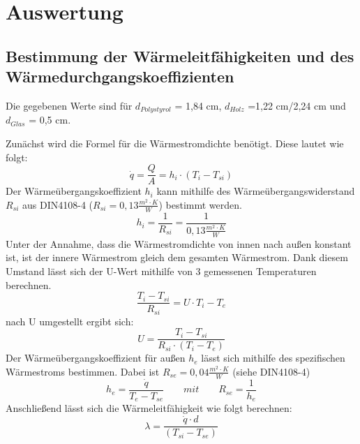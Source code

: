 \section{Auswertung}
\subsection{Bestimmung der Wärmeleitfähigkeiten und des Wärmedurchgangskoeffizienten}
Die gegebenen Werte sind für $d_{Polystyrol}$ = 1,84 cm, $d_{Holz}$ =1,22 cm/2,24 cm und $d_{Glas}$ = 0,5 cm.

Zunächst wird die Formel für die Wärmestromdichte benötigt. Diese lautet wie folgt:
\begin{equation}
\dot q=\frac{ Q }{ A }=h_{ i }\cdot(T_{ i }-T_{si})
  \label{eq:230514_Wärmestromdichte}
\end{equation}
Der Wärmeübergangskoeffizient $h_{i}$ kann mithilfe des Wärmeübergangswiderstand $R_{si}$ aus DIN4108-4 ($R_{si}=0,13 \frac{m^2 \cdot K}{W} $) bestimmt werden.
\begin{equation}
h_{i}=\frac{ 1 }{ R_{ si } }=\frac{ 1 }{ 0,13 \frac{m^2\cdot K}{ W }}
  \label{eq:230514_Wärmeübergangskoeffizient}
\end{equation}
Unter der Annahme, dass die Wärmestromdichte von innen nach außen konstant ist, ist der innere Wärmestrom gleich dem gesamten Wärmestrom. Dank diesem Umstand lässt sich der U-Wert mithilfe von 3 gemessenen Temperaturen berechnen.
\begin{equation}
\frac{ T_{i} - T_{si}}{ R_{ si } }=U \cdot T_{i} - T_{e}
  \label{eq:230514_u1}
\end{equation}
nach U umgestellt ergibt sich: 
\begin{equation}
U = \frac{ T_{i} - T_{si}}{ R_{ si } \cdot  (T_{i} - T_{e})}
  \label{eq:230514_u2}
\end{equation}
Der Wärmeübergangskoeffizient für außen $h_{e}$ lässt sich mithilfe des spezifischen Wärmestroms bestimmen. Dabei ist $R_{se}=0,04 \frac{ m^2 \cdot K }{W}$ (siehe DIN4108-4)
\begin{equation}
h_{e}=\frac{ \dot q }{ T_{e} - T_{se} }   \qquad  mit     \qquad       R_{se}=\frac{ 1 }{ h_{e} }
  \label{eq:230514_h_e}
\end{equation}
Anschließend lässt sich die Wärmeleitfähigkeit wie folgt berechnen:
\begin{equation}
\lambda=\frac{ \dot q \cdot d }{  ( T_{si} - T_{se} )}
  \label{eq:230514_lamda}
\end{equation}

